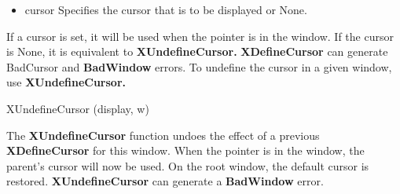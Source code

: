 \documentclass{report}
\begin{document}
\begin{itemize}
\begin{cppcode}
            \end{cppcode}
            \begin{itemize}
                \item cursor Specifies the cursor that is to be displayed or None.
            \end{itemize}
            If a cursor is set, it will be used when the pointer is in the window. If the cursor is None, it is equivalent to \textbf{XUndefineCursor.} \textbf{XDefineCursor} can generate BadCursor and \textbf{BadWindow} errors.
            \bigbreak \noindent 
            To undefine the cursor in a given window, use \textbf{XUndefineCursor.}
            \bigbreak \noindent 
            \begin{cppcode}
                XUndefineCursor (display, w)
            \end{cppcode}
            The \textbf{XUndefineCursor} function undoes the effect of a previous \textbf{XDefineCursor} for this window. When the pointer is in the window, the parent’s cursor will now be used. On the root window, the default cursor is restored.
            \bigbreak \noindent 
            \textbf{XUndefineCursor} can generate a \textbf{BadWindow} error.

    \end{itemize}
\end{document}
